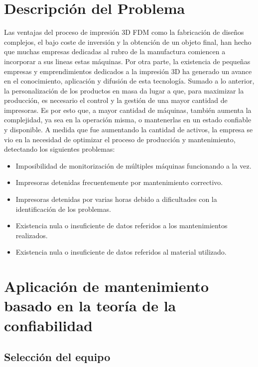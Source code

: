 \section{Descripción del Problema}

Las ventajas del proceso de impresión 3D FDM como la fabricación de diseños complejos, el bajo coste de inversión y la obtención de un objeto final, han hecho que muchas empresas dedicadas al rubro de la manufactura comiencen a incorporar a sus lineas estas máquinas. Por otra parte, la existencia de pequeñas empresas y emprendimientos dedicados a la impresión 3D ha generado un avance en el conocimiento, aplicación y difusión de esta tecnología. Sumado a lo anterior, la personalización de los productos en masa da lugar a que, para maximizar la producción, es necesario el control y la gestión de una mayor cantidad de impresoras. Es por esto que, a mayor cantidad de máquinas, también aumenta la complejidad, ya sea en la operación misma, o mantenerlas en un estado confiable y disponible. A medida que fue aumentando la cantidad de activos, la empresa se vio en la necesidad de optimizar el proceso de producción y mantenimiento, detectando los siguientes problemas:

\begin{itemize}
\item Imposibilidad de monitorización de múltiples máquinas funcionando a la vez.
\item Impresoras detenidas frecuentemente por mantenimiento correctivo.
\item Impresoras detenidas por varias horas debido a dificultades con la identificación de los problemas.
\item Existencia nula o insuficiente de datos referidos a los mantenimientos realizados.
\item Existencia nula o insuficiente de datos referidos al material utilizado.
\end{itemize}





\section{ Aplicación de mantenimiento basado en la teoría de la confiabilidad}


\subsection{Selección del equipo}


